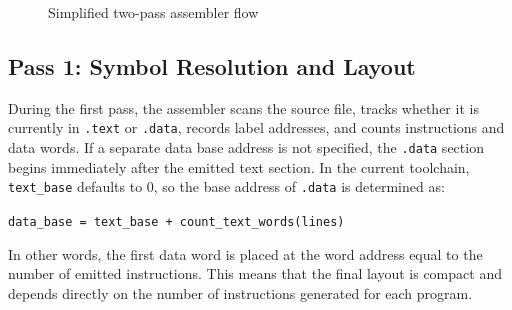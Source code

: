 \documentclass[12pt]{report}
\begin{document}
\begin{figure}[!htbp]
\centering
{}
\caption{Simplified two-pass assembler flow}
\label{fig:assembler-two-pass}
\end{figure}

\subsection{Pass 1: Symbol Resolution and Layout}

During the first pass, the assembler scans the source file, tracks whether it
is currently in \texttt{.text} or \texttt{.data}, records label addresses, and
counts instructions and data words. If a separate data base address is not
specified, the \texttt{.data} section begins immediately after the emitted text
section. In the current toolchain, \nolinkurl{text_base} defaults to 0, so the
base address of \texttt{.data} is determined as:
\begin{center}
\nolinkurl{data_base = text_base + count_text_words(lines)}
\end{center}
In other words, the first data word is placed at the word address equal to the
number of emitted instructions. This means that the final layout is compact and
depends directly on the number of instructions generated for each program.
\end{document}
